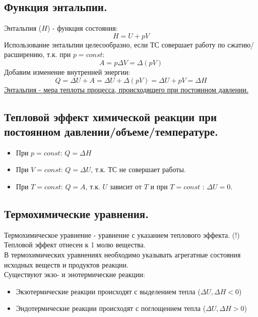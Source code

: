 \documentclass[14pt,a4paper]{scrartcl}
\begin{document}
	\subsection*{Функция энтальпии.} 	
	Энтальпия ($H$) - функция состояния:
	$$ H = U + pV $$
	Использование энтальпии целесообразно, если ТС совершает  работу по сжатию/расширению, т.к. при $p = const$:
	$$ A = p \Delta{V} = \Delta{(pV)}  $$ 
	Добавим изменение внутренней энергии:
	$$Q = \Delta{U} + A = \Delta{U} + \Delta{(pV)} = \Delta{U + pV} = \Delta{H} $$
	\underline{Энтальпия - мера теплоты процесса, происходящего при постоянном давлении.} 
	
	\subsection*{Тепловой эффект химической реакции при постоянном давлении/объеме/температуре.} 
	\begin{itemize}
		\item При $p = const$: $Q = \Delta{H}$
		\item При $V = const$: $Q = \Delta{U}$, т.к. ТС не совершает работы.
		\item При $T = const$: $Q = A$, т.к. $U$ зависит от $T$ и при $T=const$ : $\Delta{U} = 0$.
	\end{itemize}
	
	\subsection*{Термохимические уравнения.}
	Термохимическое уравнение - уравнение с указанием теплового эффекта. (!) Тепловой эффект отнесен к 1 молю вещества.\\
	В термохимических уравнениях необходимо указывать агрегатные состояния исходных веществ и продуктов реакции. \\
	Существуют экзо- и энотермические реакции:
	\begin{itemize}
		\item Экзотермические реакции происходят с выделением тепла ($\Delta{U}, \Delta{H} < 0$)
		\item Эндотермические реакции происходят с поглощением тепла ($\Delta{U}, \Delta{H} > 0$)
	\end{itemize}
\end{document}
